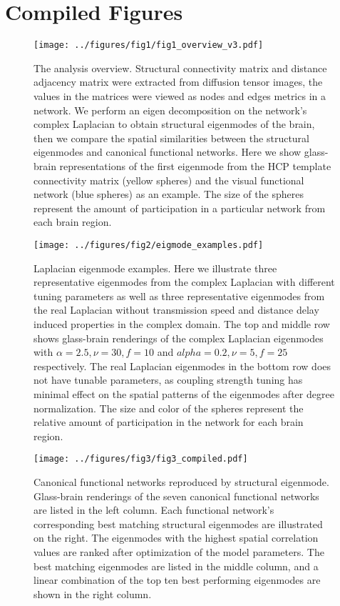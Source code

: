 \documentclass{article}
\begin{document}
\section{Compiled Figures}

\begin{figure}[ht]
  \centering
  \texttt{[image: ../figures/fig1/fig1\_overview\_v3.pdf]}
  \caption{The analysis overview. Structural connectivity matrix and distance adjacency matrix were extracted from diffusion tensor images, the values in the matrices were viewed as nodes and edges metrics in a network. We perform an eigen decomposition on the network's complex Laplacian to obtain structural eigenmodes of the brain, then we compare the spatial similarities between the structural eigenmodes and canonical functional networks. Here we show glass-brain representations of the first eigenmode from the HCP template connectivity matrix (yellow spheres) and the visual functional network (blue spheres) as an example. The size of the spheres represent the amount of participation in a particular network from each brain region.}
  \label{fig:fig1}
\end{figure}

\begin{figure}[ht]
 \centering
 \texttt{[image: ../figures/fig2/eigmode\_examples.pdf]}
 \caption{Laplacian eigenmode examples. Here we illustrate three representative eigenmodes from the complex Laplacian with different tuning parameters as well as three representative eigenmodes from the real Laplacian without transmission speed and distance delay induced properties in the complex domain. The top and middle row shows glass-brain renderings of the complex Laplacian eigenmodes with {$\alpha = 2.5, \nu = 30, f = 10$} and {$alpha = 0.2, \nu = 5, f = 25$} respectively. The real Laplacian eigenmodes in the bottom row does not have tunable parameters, as coupling strength tuning has minimal effect on the spatial patterns of the eigenmodes after degree normalization. The size and color of the spheres represent the relative amount of participation in the network for each brain region.}
 \label{fig:fig2}
\end{figure}

\begin{figure}[ht]
 \centering
 \texttt{[image: ../figures/fig3/fig3\_compiled.pdf]}
 \caption{Canonical functional networks reproduced by structural eigenmode. Glass-brain renderings of the seven canonical functional networks are listed in the left column. Each functional network's corresponding best matching structural eigenmodes are illustrated on the right. The eigenmodes with the highest spatial correlation values are ranked after optimization of the model parameters. The best matching eigenmodes are listed in the middle column, and a linear combination of the top ten best performing eigenmodes are shown in the right column.}
 \label{fig:fig3}
\end{figure}
\end{document}
